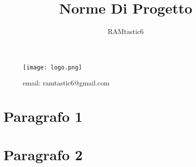 \documentclass[12pt, oneside]{article}
\author{RAMtastic6}
\begin{document}
\title{Norme Di Progetto}
\maketitle
\begin{figure}[h]
  \centering
  \texttt{[image: logo.png]}
  \caption{email: ramtastic6@gmail.com}
  \label{}
\end{figure}

\tableofcontents
\newpage

\section{Paragrafo 1}

\newpage
\section{Paragrafo 2}
\end{document}
